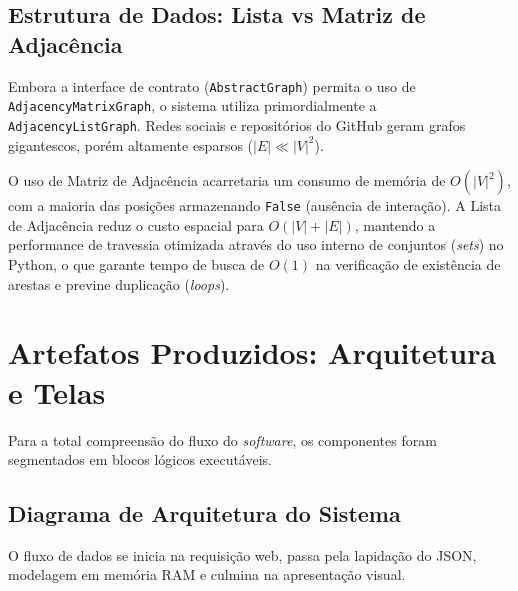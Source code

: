 \documentclass[12pt, a4paper]{article}
\begin{document}
\subsection{Estrutura de Dados: Lista vs Matriz de Adjacência}
Embora a interface de contrato (\texttt{AbstractGraph}) permita o uso de \texttt{AdjacencyMatrixGraph}, o sistema utiliza primordialmente a \texttt{AdjacencyListGraph}. Redes sociais e repositórios do GitHub geram grafos gigantescos, porém altamente esparsos ($|E| \ll |V|^2$). 

O uso de Matriz de Adjacência acarretaria um consumo de memória de $O(|V|^2)$, com a maioria das posições armazenando \texttt{False} (ausência de interação). A Lista de Adjacência reduz o custo espacial para $O(|V| + |E|)$, mantendo a performance de travessia otimizada através do uso interno de conjuntos (\textit{sets}) no Python, o que garante tempo de busca de $O(1)$ na verificação de existência de arestas e previne duplicação (\textit{loops}).

\section{Artefatos Produzidos: Arquitetura e Telas}

Para a total compreensão do fluxo do \textit{software}, os componentes foram segmentados em blocos lógicos executáveis.

\subsection{Diagrama de Arquitetura do Sistema}
O fluxo de dados se inicia na requisição web, passa pela lapidação do JSON, modelagem em memória RAM e culmina na apresentação visual.
\end{document}
